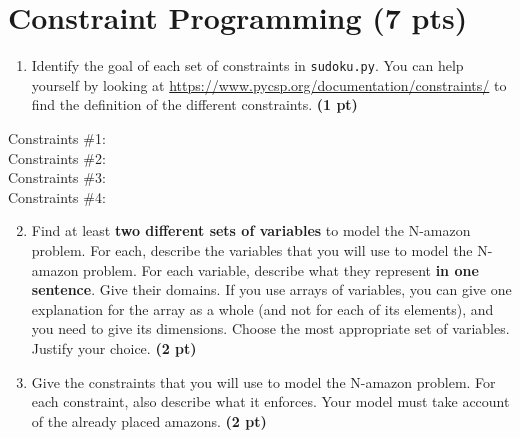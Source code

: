 \documentclass[11pt,a4paper]{report}
\begin{document}
\maketitle

\section{Constraint Programming (7 pts)}

\begin{enumerate}
\item Identify the goal of each set of constraints in \texttt{sudoku.py}. You can help yourself by looking 
at \url{https://www.pycsp.org/documentation/constraints/} to find the definition of the different constraints. \textbf{(1 pt)}
\end{enumerate}

\begin{answers}[4cm]
Constraints \#1: \\
Constraints \#2: \\
Constraints \#3: \\
Constraints \#4: \\
\end{answers}



\begin{enumerate}
	\setcounter{enumi}{1}
	\item Find at least \textbf{two different sets of variables} to model the N-amazon problem.
	For each, describe the variables that you will use to model the N-amazon problem. 
	For each variable, describe what they represent \textbf{in one sentence}. Give their domains.
	If you use arrays of variables, you can give one explanation for the array as a whole (and not for each of its elements), 
	and you need to give its dimensions.
	Choose the most appropriate set of variables. Justify your choice. \textbf{(2 pt)}

\end{enumerate}

\begin{answers}[6cm]

\end{answers}

\begin{enumerate}
	\setcounter{enumi}{2}
	\item  Give the constraints that you will use to model the N-amazon problem.
	For each constraint, also describe what it enforces.
	Your model must take account of the already placed amazons. \textbf{(2 pt)}

\end{enumerate}
\end{document}
